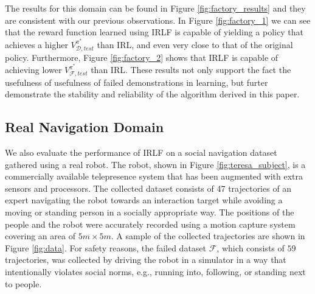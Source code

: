 \documentclass{aamas2016}
\begin{document}
The results for this domain can be found in Figure \ref{fig:factory_results} and they are consistent with our previous observations. In Figure \ref{fig:factory_1} we can see that the reward function learned using IRLF is capable of yielding a policy that achieves a higher $V^{\pi^*}_{\mathcal{D},test}$ than IRL, and even very close to that of the original policy. Furthermore, Figure \ref{fig:factory_2} shows that IRLF is capable of achieving lower $V^{\pi^*}_{\mathcal{F},test}$ than IRL. These results not only support the fact the usefulness of usefulness of failed demonstrations in learning, but furter demonstrate the stability and reliability of the algorithm derived in this paper.


\subsection{Real Navigation Domain}
We also evaluate the performance of IRLF on a social navigation dataset gathered using a real robot. The robot, shown in Figure \ref{fig:teresa_subject}, is a commercially available telepresence system that has been augmented with extra sensors and processors. The collected dataset consists of 47 trajectories of an expert navigating the robot towards an interaction target while avoiding a moving or standing  person in a socially appropriate way. The positions of the people and the robot were accurately recorded using a motion capture system covering an area of $5m \times 5m$. A sample of the collected trajectories are shown in Figure \ref{fig:data}. For safety reasons, the failed dataset $\mathcal{F}$, which consists of $59$ trajectories, was collected by driving the robot in a simulator in a way that intentionally violates social norms, e.g., running into, following, or standing next to people. 
\end{document}
